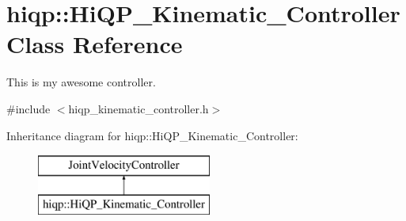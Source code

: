 \hypertarget{classhiqp_1_1HiQP__Kinematic__Controller}{\section{hiqp\-:\-:Hi\-Q\-P\-\_\-\-Kinematic\-\_\-\-Controller Class Reference}
\label{classhiqp_1_1HiQP__Kinematic__Controller}
}


This is my awesome controller.  




{\ttfamily \#include $<$hiqp\-\_\-kinematic\-\_\-controller.\-h$>$}

Inheritance diagram for hiqp\-:\-:Hi\-Q\-P\-\_\-\-Kinematic\-\_\-\-Controller\-:\begin{figure}[H]
\begin{center}
\leavevmode
\includegraphics[height=2.000000cm]{classhiqp_1_1HiQP__Kinematic__Controller}
\end{center}
\end{figure}
